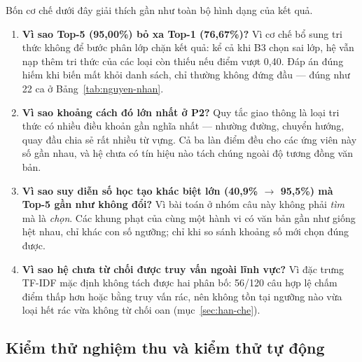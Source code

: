 Bốn cơ chế dưới đây giải thích gần như toàn bộ hình dạng của kết quả.
\begin{enumerate}
  \item \textbf{Vì sao Top-5 (95,00\%) bỏ xa Top-1 (76,67\%)?} Vì cơ chế bổ sung tri thức không
        để bước phân lớp chặn kết quả: kể cả khi B3 chọn sai lớp, hệ vẫn nạp thêm tri thức của
        các loại còn thiếu nếu điểm vượt 0,40. Đáp án đúng hiếm khi biến mất khỏi danh sách,
        chỉ thường không đứng đầu --- đúng như 22 ca ở Bảng~\ref{tab:nguyen-nhan}.
  \item \textbf{Vì sao khoảng cách đó lớn nhất ở P2?} Quy tắc giao thông là loại tri thức có
        nhiều điều khoản gần nghĩa nhất --- nhường đường, chuyển hướng, quay đầu chia sẻ rất
        nhiều từ vựng. Cả ba làn điểm đều cho các ứng viên này số gần nhau, và hệ chưa có tín
        hiệu nào tách chúng ngoài độ tương đồng văn bản.
  \item \textbf{Vì sao suy diễn số học tạo khác biệt lớn (40,9\% $\to$ 95,5\%) mà Top-5 gần như
        không đổi?} Vì bài toán ở nhóm câu này không phải \emph{tìm} mà là \emph{chọn}. Các khung
        phạt của cùng một hành vi có văn bản gần như giống hệt nhau, chỉ khác con số ngưỡng; chỉ
        khi so sánh khoảng số mới chọn đúng được.
  \item \textbf{Vì sao hệ chưa từ chối được truy vấn ngoài lĩnh vực?} Vì đặc trưng TF-IDF mặc
        định không tách được hai phân bố: 56/120 câu hợp lệ chấm điểm thấp hơn hoặc bằng truy
        vấn rác, nên không tồn tại ngưỡng nào vừa loại hết rác vừa không từ chối oan
        (mục~\ref{sec:han-che}).
\end{enumerate}

\subsection{Kiểm thử nghiệm thu và kiểm thử tự động}

